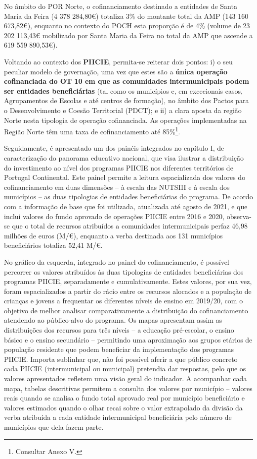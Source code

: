 \documentclass[
]{book}
\begin{document}
No âmbito do POR Norte, o cofinanciamento destinado a entidades de Santa Maria da Feira (4 378 284,80€) totaliza 3\% do montante total da AMP (143 160 673,82€), enquanto no contexto do POCH esta proporção é de 4\% (volume de 23 202 113,43€ mobilizado por Santa Maria da Feira no total da AMP que ascende a 619 559 890,53€).

Voltando ao contexto dos \textbf{PIICIE}, permita-se reiterar dois pontos: i) o seu peculiar modelo de governação, uma vez que estes são a \textbf{única operação cofinanciada do OT 10 em que as comunidades intermunicipais podem ser entidades beneficiárias} (tal como os municípios e, em excecionais casos, Agrupamentos de Escolas e até centros de formação), no âmbito dos Pactos para o Desenvolvimento e Coesão Territorial (PDCT); e ii) a clara aposta da região Norte nesta tipologia de operação cofinanciada. As operações implementadas na Região Norte têm uma taxa de cofinanciamento até 85\%\footnote{Consultar Anexo V.}.

Seguidamente, é apresentado um dos painéis integrados no capítulo I, de caracterização do panorama educativo nacional, que visa ilustrar a distribuição do investimento ao nível dos programas PIICIE nos diferentes territórios de Portugal Continental. Este painel permite a leitura espacializada dos valores do cofinanciamento em duas dimensões -- à escala das NUTSIII e à escala dos municípios -- as duas tipologias de entidades beneficiárias do programa. De acordo com a informação de base que foi utilizada, atualizada até agosto de 2021, e que inclui valores do fundo aprovado de operações PIICIE entre 2016 e 2020, observa-se que o total de recursos atribuídos a comunidades intermunicipais perfaz 46,98 milhões de euros (M/€), enquanto a verba destinada aos 131 municípios beneficiários totaliza 52,41 M/€.

No gráfico da esquerda, integrado no painel do cofinanciamento, é possível percorrer os valores atribuídos às duas tipologias de entidades beneficiárias dos programas PIICIE, separadamente e cumulativamente. Estes valores, por sua vez, foram espacializados a partir do rácio entre os recursos alocados e a população de crianças e jovens a frequentar os diferentes níveis de ensino em 2019/20, com o objetivo de melhor analisar comparativamente a distribuição do cofinanciamento atendendo ao público-alvo do programa. Os mapas apresentam assim as distribuições dos recursos para três níveis -- a educação pré-escolar, o ensino básico e o ensino secundário -- permitindo uma aproximação aos grupos etários de população residente que podem beneficiar da implementação dos programas PIICIE. Importa sublinhar que, não foi possível aferir a que público concreto cada PIICIE (intermunicipal ou municipal) pretendia dar respostas, pelo que os valores apresentados refletem uma visão geral do indicador. A acompanhar cada mapa, tabelas descritivas permitem a consulta dos valores por município -- valores reais quando se analisa o fundo total aprovado real por município beneficiário e valores estimados quando o olhar recai sobre o valor extrapolado da divisão da verba atribuída a cada entidade intermunicipal beneficiária pelo número de municípios que dela fazem parte.
\end{document}
